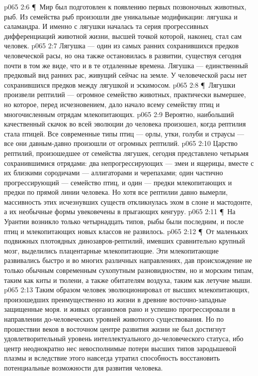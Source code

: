 \vs p065 2:6 \P\ Мир был подготовлен к появлению первых позвоночных животных, рыб. Из семейства рыб произошли две уникальные модификации: лягушка и саламандра. И именно с лягушки началась та серия прогрессивных дифференциаций животной жизни, высшей точкой которой, наконец, стал сам человек.
\vs p065 2:7 Лягушка --- один из самых ранних сохранившихся предков человеческой расы, но она также остановилась в развитии, существуя сегодня почти в том же виде, что и в те отдаленные времена. Лягушка --- единственный предковый вид ранних рас, живущий сейчас на земле. У человеческой расы нет сохранившихся предков между лягушкой и эскимосом.
\vs p065 2:8 \P\ Лягушки произвели рептилий --- огромное семейство животных, практически вымершее, но которое, перед исчезновением, дало начало всему семейству птиц и многочисленным отрядам млекопитающих.
\vs p065 2:9 Вероятно, наибольший качественный скачок во всей эволюции до человека произошел, когда рептилия стала птицей. Все современные типы птиц --- орлы, утки, голуби и страусы --- все они давным\hyp{}давно произошли от огромных рептилий.
\vs p065 2:10 Царство рептилий, произошедшее от семейства лягушек, сегодня представлено четырьмя сохранившимися отрядами: два непрогрессирующих --- змеи и ящерицы, вместе с их близкими сородичами --- аллигаторами и черепахами; один частично прогрессирующий --- семейство птиц, и один --- предки млекопитающих и предки по прямой линии человека. Но хотя все рептилии давно вымерли, массивность этих исчезнувших существ откликнулась эхом в слоне и мастодонте, а их необычные формы увековечены в прыгающих кенгуру.
\vs p065 2:11 \P\ На Урантии возникло только четырнадцать типов, рыбы были последним, и после птиц и млекопитающих новых классов не развилось.
\vs p065 2:12 \P\ От маленьких подвижных плотоядных динозавров\hyp{}рептилий, имевших сравнительно крупный мозг,  выделились плацентарные млекопитающие. Эти млекопитающие развивались быстро и во многих различных направлениях, дав происхождение не только обычным современным сухопутным разновидностям, но и морским типам, таким как киты и тюлени, а также обитателям воздуха, таким как летучие мыши.
\vs p065 2:13 Таким образом человек эволюционировал от высших млекопитающих, произошедших преимущественно из  жизни в древние восточно\hyp{}западные защищенные моря.  и  живых организмов рано и успешно прогрессировали в направлении до\hyp{}человеческих уровней животного существования. Но по прошествии веков в восточном центре развития жизни не был достигнут удовлетворительный уровень интеллектуального до\hyp{}человеческого статуса, ибо центр неоднократно нес невосполнимые потери высших типов зародышевой плазмы и вследствие этого навсегда утратил способность восстановить потенциальные возможности для развития человека.
